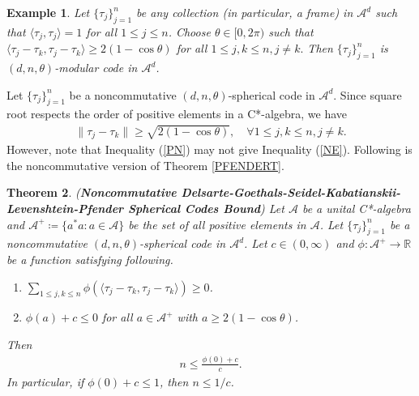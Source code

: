 \documentclass{amsart}
\newtheorem{theorem}{Theorem}[section]
\newtheorem{example}[theorem]{Example}
\begin{document}
\begin{example}
	Let $\{\tau_j\}_{j=1}^n$ be any collection (in particular,  a frame) in $\mathcal{A}^d$ such that $\langle \tau_j, \tau_j\rangle =1$ for all $1\leq j \leq n$. Choose  $ \theta \in [0, 2 \pi)$  such that $\langle \tau_j-\tau_k,  \tau_j-\tau_k\rangle\geq 2(1-\cos \theta)$ for all $ 1\leq j, k \leq n, j \neq k.$
	Then $\{\tau_j\}_{j=1}^n$ is $(d, n, \theta)$-modular code in $\mathcal{A}^d$.
\end{example}
Let $\{\tau_j\}_{j=1}^n$  be a   noncommutative $(d,n,\theta )$-spherical code  in $\mathcal{A}^d$. Since square root respects the order of positive elements in a C*-algebra, we have 
\begin{align}\label{PN}
	\|\tau_j-\tau_k\|\geq \sqrt{2(1-\cos \theta)},	\quad  \forall 1\leq j, k \leq n,  j \neq k.
\end{align}
However, note that Inequality (\ref{PN}) may not give Inequality   (\ref{NE}). 
Following is the noncommutative version of Theorem \ref{PFENDERT}.
\begin{theorem} (\textbf{Noncommutative Delsarte-Goethals-Seidel-Kabatianskii-Levenshtein-Pfender Spherical Codes Bound}) \label{PDGSP}
Let $\mathcal{A}$ be a unital C*-algebra and $\mathcal{A}^+\coloneqq \{a^*a:a \in \mathcal{A}\}$ be the set of all positive elements in $\mathcal{A}$.	Let $\{\tau_j\}_{j=1}^n$  be a  noncommutative $(d,n,\theta )$-spherical code in $\mathcal{A}^d$. Let $c\in (0, \infty)$ and $\phi:\mathcal{A}^+\to \mathbb{R}$ be a function satisfying following.
	\begin{enumerate}[\upshape(i)]
		\item $\sum_{1\leq j,k \leq n}\phi(\langle \tau_j-\tau_k, \tau_j-\tau_k\rangle)\geq 0$.
		\item $\phi(a)+c\leq 0$ for all $ a\in \mathcal{A}^+ $  with  $ a \geq 2(1-\cos \theta)$.
	\end{enumerate}
Then 
	\begin{align*}
		n\leq \frac{\phi(0)+c}{c}.
	\end{align*}
	In particular, if $\phi(0)+c\leq 1$, then $n\leq 1/c$.	
\end{theorem}
\end{document}
